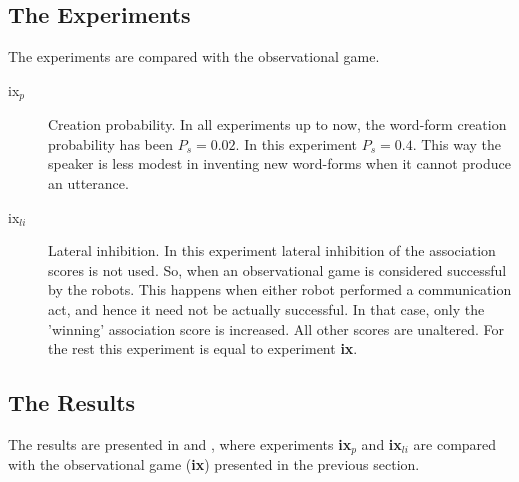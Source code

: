 \subsection{The Experiments}

The experiments are compared with the observational game.

\begin{description}
\item[ix$_p$] Creation probability. In all experiments up to now, the word-form creation probability has been $P_s=0.02$. In this experiment $P_s=0.4$. This way the speaker is less modest in inventing new word-forms when it cannot produce an utterance. 
\item[ix$_{li}$] Lateral inhibition. In this experiment lateral inhibition of the association scores is not used. So, when an observational game is considered successful by the robots. This happens when either robot performed a communication act, and hence it need not be actually successful. In that case, only the 'winning' association score is increased. All other scores are unaltered. For the rest this experiment is equal to experiment {\bf ix}. 
\end{description}

\subsection{The Results}

The results are presented in  and , where experiments {\bf ix$_p$} and {\bf ix$_{li}$} are compared with the observational game ({\bf ix}) presented in the previous section.


